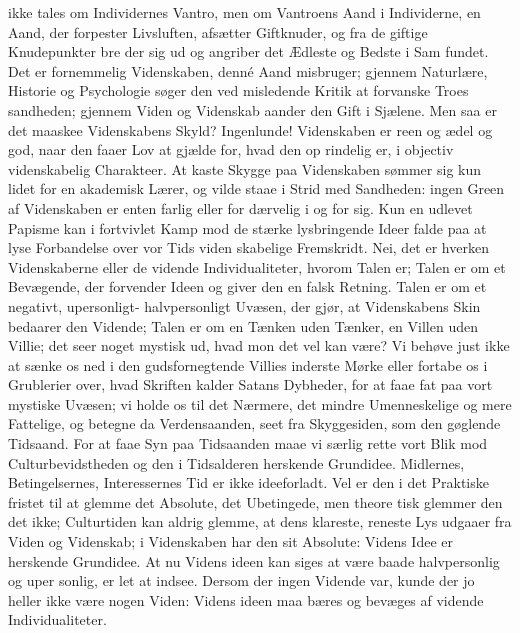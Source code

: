 \documentclass[12pt]{book}
\newcommand{\opage}[1]{\marginnote{\footnotesize\textit{[#1]}}}
\begin{document}
ikke tales om Individernes Vantro, men om Vantroens
Aand i Individerne, en Aand, der forpester Livsluften,
afsætter Giftknuder, og fra de giftige Knudepunkter bre\-%
\opage{55}\setcounter{footnote}{0}%
der sig ud og angriber det Ædleste og Bedste i Sam\-%
fundet. Det er fornemmelig Videnskaben, denné Aand %
misbruger; gjennem Naturlære, Historie og Psychologie
søger den ved misledende Kritik at forvanske Troes\-%
sandheden; gjennem Viden og Videnskab aander den
Gift i Sjælene. Men saa er det maaskee Videnskabens
Skyld? Ingenlunde! Videnskaben er reen og ædel og
god, naar den faaer Lov at gjælde for, hvad den op\-%
rindelig er, i objectiv videnskabelig Charakteer. At kaste
Skygge paa Videnskaben sømmer sig kun lidet for en
akademisk Lærer, og vilde staae i Strid med Sandheden:
ingen Green af Videnskaben er enten farlig eller for\-%
dærvelig i og for sig. Kun en udlevet Papisme kan
i fortvivlet Kamp mod de stærke lysbringende Ideer
falde paa at lyse Forbandelse over vor Tids viden\-%
skabelige Fremskridt. Nei, det er hverken Videnskaberne
eller de vidende Individualiteter, hvorom Talen er; Talen
er om et Bevægende, der forvender Ideen og giver den
en falsk Retning. Talen er om et negativt, upersonligt-%
halvpersonligt Uvæsen, der gjør, at Videnskabens Skin
bedaarer den Vidende; Talen er om en Tænken uden
Tænker, en Villen uden Villie; det seer noget mystisk
ud, hvad mon det vel kan være? Vi behøve just ikke at
sænke os ned i den gudsfornegtende Villies inderste Mørke
eller fortabe os i Grublerier over, hvad Skriften kalder
Satans Dybheder, for at faae fat paa vort mystiske Uvæsen;
vi holde os til det Nærmere, det mindre Umenneskelige
og mere Fattelige, og betegne da Verdensaanden, seet
fra Skyggesiden, som den gøglende Tidsaand. For at
faae Syn paa Tidsaanden maae vi særlig rette vort Blik
mod Culturbevidstheden og den i Tidsalderen herskende
Grundidee. Midlernes, Betingelsernes, Interessernes Tid
er ikke ideeforladt. Vel er den i det Praktiske fristet
til at glemme det Absolute, det Ubetingede, men theore\-%
\opage{56}\setcounter{footnote}{0}%
tisk glemmer den det ikke; Culturtiden kan aldrig
glemme, at dens klareste, reneste Lys udgaaer fra Viden
og Videnskab; i Videnskaben har den sit Absolute:
Videns Idee er herskende Grundidee. At nu Videns\-%
ideen kan siges at være baade halvpersonlig og uper\-%
sonlig, er let at indsee. Dersom der ingen Vidende var,
kunde der jo heller ikke være nogen Viden: Videns\-%
ideen maa bæres og bevæges af vidende Individualiteter.
\end{document}
